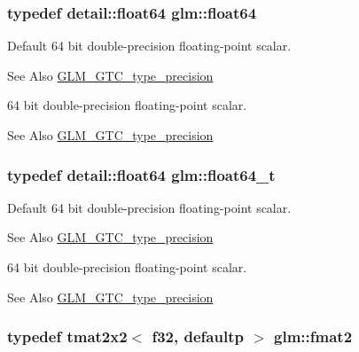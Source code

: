\hypertarget{group__gtc__type__precision_gab721f828b41f46b20cf4883b50733d3b}{
\subsubsection[{float64}]{\setlength{\rightskip}{0pt plus 5cm}typedef detail\-::float64 {\bf glm\-::float64}}}\label{group__gtc__type__precision_gab721f828b41f46b20cf4883b50733d3b}
Default 64 bit double-\/precision floating-\/point scalar. \begin{DoxySeeAlso}{See Also}
\hyperlink{group__gtc__type__precision}{G\-L\-M\-\_\-\-G\-T\-C\-\_\-type\-\_\-precision}
\end{DoxySeeAlso}
64 bit double-\/precision floating-\/point scalar. \begin{DoxySeeAlso}{See Also}
\hyperlink{group__gtc__type__precision}{G\-L\-M\-\_\-\-G\-T\-C\-\_\-type\-\_\-precision} 
\end{DoxySeeAlso}
\hypertarget{group__gtc__type__precision_gade966a3eb25ebeb16dd53c40d3fdeb46}{
\subsubsection[{float64\-\_\-t}]{\setlength{\rightskip}{0pt plus 5cm}typedef detail\-::float64 {\bf glm\-::float64\-\_\-t}}}\label{group__gtc__type__precision_gade966a3eb25ebeb16dd53c40d3fdeb46}
Default 64 bit double-\/precision floating-\/point scalar. \begin{DoxySeeAlso}{See Also}
\hyperlink{group__gtc__type__precision}{G\-L\-M\-\_\-\-G\-T\-C\-\_\-type\-\_\-precision}
\end{DoxySeeAlso}
64 bit double-\/precision floating-\/point scalar. \begin{DoxySeeAlso}{See Also}
\hyperlink{group__gtc__type__precision}{G\-L\-M\-\_\-\-G\-T\-C\-\_\-type\-\_\-precision} 
\end{DoxySeeAlso}
\hypertarget{group__gtc__type__precision_gab8e1ce0a2648cfcd645eed2d8ea96f21}{
\subsubsection[{fmat2}]{\setlength{\rightskip}{0pt plus 5cm}typedef tmat2x2$<$ f32, defaultp $>$ {\bf glm\-::fmat2}}}\label{group__gtc__type__precision_gab8e1ce0a2648cfcd645eed2d8ea96f21}
